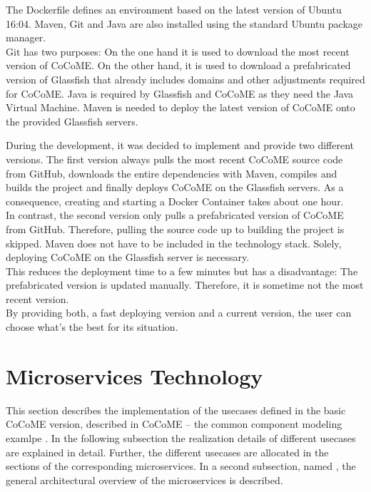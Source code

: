 The Dockerfile defines an environment based on the latest version of Ubuntu 16:04. Maven, Git and Java are also installed using the standard Ubuntu package manager.\\
Git has two purposes: On the one hand it is used to download the most recent version of CoCoME.	On the other hand, it is used to download a prefabricated version of Glassfish that already includes domains and other adjustments required for CoCoME. Java is required by Glassfish and CoCoME as they need the Java Virtual Machine. Maven is needed to deploy the latest version of CoCoME onto the provided Glassfish servers.
	
	
	During the development, it was decided to implement and provide two different versions. The first version always pulls the most recent CoCoME source code from GitHub, downloads the entire dependencies with Maven, compiles and builds the project and finally deploys CoCoME on the Glassfish servers. As a consequence, creating and starting a Docker Container takes about one hour.\\
	In contrast, the second version only pulls a prefabricated version of CoCoME from GitHub. 
	Therefore, pulling the source code up to building the project is skipped. Maven does not have to be included in the technology stack. Solely, deploying CoCoME on the Glassfish server is necessary.\\
	This reduces the deployment time to a few minutes but has a disadvantage: The prefabricated version is updated manually. Therefore, it is sometime not the most recent version.\\
	By providing both, a fast deploying version and a current version, the user can choose what's the best for its situation.
	

	

	
\section{Microservices Technology} \label{MS}
	This section describes the implementation of the usecases defined in the basic CoCoME version, described in CoCoME -- the common component modeling examlpe \cite[p.4-10]{herold2008}. In the following subsection the realization details of different usecases are explained in detail. Further, the different usecases are allocated in the sections of the corresponding microservices. In a second subsection, named , the general architectural overview of the microservices is described.
	
